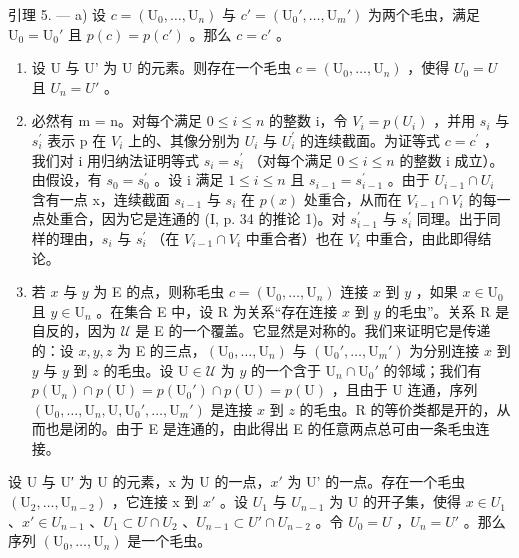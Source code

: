 引理 5. --- a) 设 \(c = (\mathrm{U}_0, \ldots, \mathrm{U}_n)\) 与 \(c' = (\mathrm{U}_0', \ldots, \mathrm{U}_m')\) 为两个毛虫，满足 \(\mathrm{U}_0 = \mathrm{U}_0'\) 且 \(p(c) = p(c')\) 。那么 \(c = c'\) 。

\begin{enumerate}
\def\labelenumi{\alph{enumi})}
\setcounter{enumi}{1}
\item
  设 U 与 U' 为 U 的元素。则存在一个毛虫 \(c = (\mathrm{U}_{0}, \ldots, \mathrm{U}_{n})\) ，使得 \(U_{0} = U\) 且 \(U_{n} = U'\) 。
\item
  必然有 m = n。对每个满足 \(0 \leqslant i \leqslant n\) 的整数 i，令 \(V_{i} = p(U_{i})\) ，并用 \(s_{i}\) 与 \(s_{i}^{\prime}\) 表示 p 在 \(V_{i}\) 上的、其像分别为 \(U_{i}\) 与 \(U_{i}^{\prime}\) 的连续截面。为证等式 \(c = c^{\prime}\) ，我们对 i 用归纳法证明等式 \(s_{i} = s_{i}^{\prime}\) （对每个满足 \(0 \leqslant i \leqslant n\) 的整数 i 成立）。由假设，有 \(s_{0} = s_{0}^{\prime}\) 。设 i 满足 \(1 \leqslant i \leqslant n\) 且 \(s_{i-1} = s_{i-1}^{\prime}\) 。由于 \(U_{i-1} \cap U_{i}\) 含有一点 x，连续截面 \(s_{i-1}\) 与 \(s_{i}\) 在 \(p(x)\) 处重合，从而在 \(V_{i-1} \cap V_{i}\) 的每一点处重合，因为它是连通的 (I, p. 34 的推论 1)。对 \(s_{i-1}^{\prime}\) 与 \(s_{i}^{\prime}\) 同理。出于同样的理由，\(s_{i}\) 与 \(s_{i}^{\prime}\) （在 \(V_{i-1} \cap V_{i}\) 中重合者）也在 \(V_{i}\) 中重合，由此即得结论。
\item
  若 \(x\) 与 \(y\) 为 E 的点，则称毛虫 \(c = (\mathrm{U}_0, \ldots, \mathrm{U}_n)\) 连接 \(x\) 到 \(y\) ，如果 \(x \in \mathrm{U}_0\) 且 \(y \in \mathrm{U}_n\) 。在集合 E 中，设 R 为关系“存在连接 \(x\) 到 \(y\) 的毛虫”。关系 R 是自反的，因为 \(\mathcal{U}\) 是 E 的一个覆盖。它显然是对称的。我们来证明它是传递的：设 \(x, y, z\) 为 E 的三点，\((\mathrm{U}_0, \ldots, \mathrm{U}_n)\) 与 \((\mathrm{U}_0', \ldots, \mathrm{U}_m')\) 为分别连接 \(x\) 到 \(y\) 与 \(y\) 到 \(z\) 的毛虫。设 \(\mathrm{U} \in \mathcal{U}\) 为 \(y\) 的一个含于 \(\mathrm{U}_n \cap \mathrm{U}_0'\) 的邻域；我们有 \(p(\mathrm{U}_n) \cap p(\mathrm{U}) = p(\mathrm{U}_0') \cap p(\mathrm{U}) = p(\mathrm{U})\) ，且由于 U 连通，序列 \((\mathrm{U}_0, \ldots, \mathrm{U}_n, \mathrm{U}, \mathrm{U}_0', \ldots, \mathrm{U}_m')\) 是连接 \(x\) 到 \(z\) 的毛虫。R 的等价类都是开的，从而也是闭的。由于 E 是连通的，由此得出 E 的任意两点总可由一条毛虫连接。
\end{enumerate}

设 U 与 U′ 为 U 的元素，x 为 U 的一点，\(x'\) 为 U' 的一点。存在一个毛虫 \((\mathrm{U}_{2},\ldots,\mathrm{U}_{n-2})\) ，它连接 x 到 \(x'\) 。设 \(U_{1}\) 与 \(U_{n-1}\) 为 U 的开子集，使得 \(x \in U_{1}\) 、\(x' \in U_{n-1}\) 、\(U_{1} \subset U \cap U_{2}\) 、\(U_{n-1} \subset U' \cap U_{n-2}\) 。令 \(U_{0} = U\) ，\(U_{n} = U'\) 。那么序列 \((\mathrm{U}_{0},\ldots,\mathrm{U}_{n})\) 是一个毛虫。

